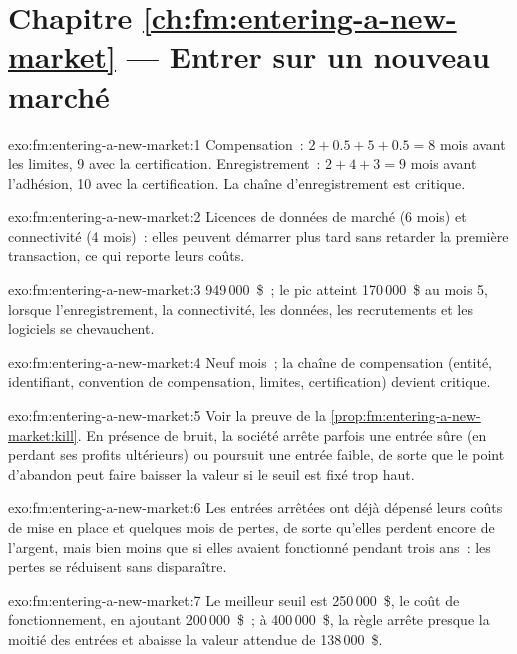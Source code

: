 \section*{Chapitre \ref{ch:fm:entering-a-new-market} --- Entrer sur un nouveau marché}

\begin{solution}{exo:fm:entering-a-new-market:1}
Compensation~: $2+0.5+5+0.5=8$ mois avant les limites, 9 avec la certification. Enregistrement~: $2+4+3=9$ mois avant l'adhésion, 10 avec la certification. La
chaîne d'enregistrement est critique.
\end{solution}

\begin{solution}{exo:fm:entering-a-new-market:2}
Licences de données de marché (6 mois) et connectivité (4 mois)~: elles peuvent démarrer plus tard sans retarder la première transaction, ce qui reporte leurs coûts.
\end{solution}

\begin{solution}{exo:fm:entering-a-new-market:3}
949\,000~\$~; le pic atteint 170\,000~\$ au mois 5, lorsque l'enregistrement, la connectivité, les données, les recrutements et les logiciels se chevauchent.
\end{solution}

\begin{solution}{exo:fm:entering-a-new-market:4}
Neuf mois~; la chaîne de compensation (entité, identifiant, convention de compensation, limites, certification) devient critique.
\end{solution}

\begin{solution}{exo:fm:entering-a-new-market:5}
Voir la preuve de la \cref{prop:fm:entering-a-new-market:kill}. En présence de bruit, la société arrête parfois une entrée sûre (en perdant ses profits ultérieurs) ou
poursuit une entrée faible, de sorte que le point d'abandon peut faire baisser la valeur si le seuil est fixé trop haut.
\end{solution}

\begin{solution}{exo:fm:entering-a-new-market:6}
Les entrées arrêtées ont déjà dépensé leurs coûts de mise en place et quelques mois de pertes, de sorte qu'elles perdent encore de l'argent, mais bien moins que si elles avaient fonctionné pendant
trois ans~: les pertes se réduisent sans disparaître.
\end{solution}

\begin{solution}{exo:fm:entering-a-new-market:7}
Le meilleur seuil est 250\,000~\$, le coût de fonctionnement, en ajoutant 200\,000~\$~; à 400\,000~\$, la règle arrête presque la moitié des entrées et abaisse la
valeur attendue de 138\,000~\$.
\end{solution}

